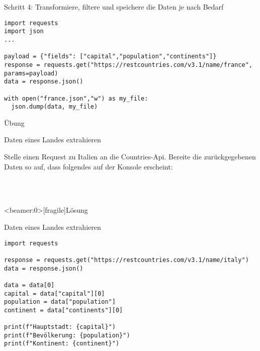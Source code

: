 \begin{fragile}
\begin{block}{Schritt 4: Transformiere, filtere und speichere die Daten je nach Bedarf}
\vspace{2pt}

\begin{verbatim}
import requests
import json
...

payload = {"fields": ["capital","population","continents"]}
response = requests.get("https://restcountries.com/v3.1/name/france", params=payload)
data = response.json()

with open("france.json","w") as my_file:
  json.dump(data, my_file)

\end{verbatim}
\end{block}
\end{fragile}


\begin{frame}{Übung}

\begin{block}{Daten eines Landes extrahieren}
\vspace{2pt}

Stelle einen Request zu Italien an die Countries-Api. Bereite die zurückgegebenen Daten so auf, dass folgendes auf der Konsole erscheint: 

 \\
 \\
\end{block}
\end{frame}






\begin{frame}<beamer:0>[fragile]{Lösung}
\begin{solutionblock}{Daten eines Landes extrahieren}
\begin{verbatim}
import requests

response = requests.get("https://restcountries.com/v3.1/name/italy")
data = response.json()

data = data[0]
capital = data["capital"][0]
population = data["population"]
continent = data["continents"][0]

print(f"Hauptstadt: {capital}")
print(f"Bevölkerung: {population}")
print(f"Kontinent: {continent}")
\end{verbatim}
\end{solutionblock}
\end{frame}










